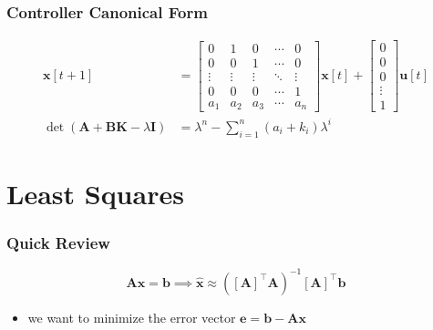 \documentclass[aspectratio=169]{beamer}
\newcommand{\tpose}[1]{\left[#1\right]^{\! \top} \!\!}
\begin{document}
\begin{frame}
    \frametitle{Controller Canonical Form}

    \begin{align}
        \bm{x}[t + 1] &=
        \begin{bmatrix}
            0 & 1 & 0 & \cdots & 0 \\
            0 & 0 & 1 & \cdots & 0 \\
            \vdots & \vdots & \vdots & \ddots & \vdots \\
            0 & 0 & 0 & \cdots & 1 \\
            a_1 & a_2 & a_3 & \cdots & a_n
        \end{bmatrix} \bm{x}[t] +
        \begin{bmatrix}
            0 \\
            0 \\
            0 \\
            \vdots \\
            1
        \end{bmatrix} \bm{u}[t] \\
        \det(\bm{A} + \bm{BK} - \lambda \bm{I}) &= \lambda^n - \sum_{i = 1}^n (a_i + k_i) \lambda^i
    \end{align}
\end{frame}

\section{Least Squares}

\begin{frame}
    \frametitle{Quick Review}

    \begin{equation}
        \bm{Ax} = \bm{b} \implies \bm{\hat{x}} \approx (\tpose{\bm{A}} \bm{A})^{-1} \tpose{\bm{A}} \bm{b}
    \end{equation}
    \begin{itemize}
        \item we want to minimize the error vector \(\bm{e} = \bm{b} - \bm{Ax}\)
    \end{itemize}
\end{frame}
\end{document}
